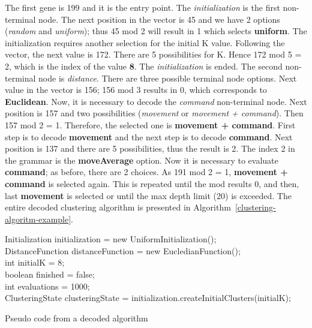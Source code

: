 \documentclass[conference,compsoc]{IEEEtran}
\begin{document}
The first gene is 199 and it is the entry point. The \textit{initialization} is the first non-terminal node. The next position in the vector is 45 and we have 2 options (\textit{random} and \textit{uniform}); thus 45 mod 2 will result in 1 which selects \textbf{uniform}. The initialization requires another selection for the initial K value. Following the vector, the next value is 172. There are 5 possibilities for K. Hence 172 mod 5 = 2, which is the index of the value \textbf{8}. The \textit{initialization} is ended. The second non-terminal node is \textit{distance}. There are three possible terminal node options. Next value in the vector is 156; 156 mod 3 results in 0, which corresponds to \textbf{Euclidean}. Now, it is necessary to decode the \textit{command} non-terminal node. Next position is 157 and two possibilities (\textit{movement} or \textit{movement + command}). Then 157 mod 2 = 1. Therefore, the selected one is \textbf{movement + command}. First step is to decode \textbf{movement} and the next step  is to  decode  \textbf{command}. Next position is 137 and there are 5 possibilities, thus the result is 2. The index 2 in the grammar is the \textbf{moveAverage} option. Now it is necessary to evaluate \textbf{command}; as before, there are 2 choices. As 191 mod 2 = 1, \textbf{movement + command} is selected again. This is repeated until the mod results 0,  and then, last \textbf{movement} is selected or until the max depth limit (20) is exceeded. The entire decoded clustering algorithm is presented in Algorithm~\ref{clustering-algoritm-example}.

\begin{algorithm}[!htb]
	\label{clustering-algoritm-example}
	Initialization initialization = new UniformInitialization(); \\
	DistanceFunction distanceFunction = new EucledianFunction(); \\
	int initialK = 8; \\
	boolean finished = false; \\
	int evaluations = 1000;\\
	ClusteringState 
	clusteringState = initialization.createInitialClusters(initialK); \\
	\caption{Pseudo code from a decoded algorithm}
\end{algorithm}
\end{document}

